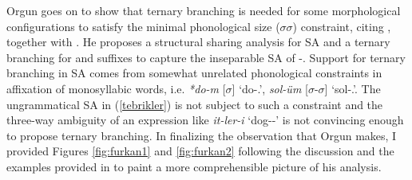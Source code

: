 Orgun goes on to show that ternary branching is needed for some morphological configurations to satisfy the minimal phonological size ($\sigma\sigma$) constraint, citing \cite{ito1989notes}, together with \cite{orgun1992turkish}. He proposes a structural sharing analysis for SA and a ternary branching for {\Pl} and {\Poss} suffixes to capture the inseparable SA of {\Pl-\Poss}. Support for ternary branching in SA comes from somewhat unrelated phonological constraints in affixation of monosyllabic words, i.e. \textit{*do-m} [$\sigma$] `do-{\Poss}.{\Fsg}', \textit{sol-üm} [$\sigma$-$\sigma$] `sol-{\Poss}.{\Fsg}'. The ungrammatical SA in (\ref{tebrikler}) is not subject to such a constraint and the three-way ambiguity of an expression like \textit{it-ler-i} `dog-{\Pl}-{\Poss}' is not convincing enough to propose ternary branching. In finalizing the observation that Orgun makes, I provided Figures \ref{fig:furkan1} and \ref{fig:furkan2} following the discussion and the examples provided in \cite{orgun1995flat} to paint a more comprehensible picture of his analysis.
